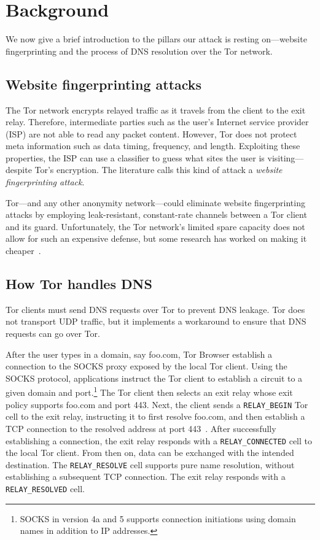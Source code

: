 \section{Background}
\label{sec:background}
We now give a brief introduction to the pillars our attack is resting
on---website fingerprinting and the process of DNS resolution over the Tor
network.

\subsection{Website fingerprinting attacks}
The Tor network encrypts relayed traffic as it travels from the client to the
exit relay.  Therefore, intermediate parties such as the user's Internet service
provider (ISP) are not able to read any packet content.  However, Tor does not
protect meta information such as data timing, frequency, and length.  Exploiting
these properties, the ISP can use a classifier to guess what sites the user is
visiting---despite Tor's encryption.  The literature calls this kind of attack a
\emph{website fingerprinting attack}.

Tor---and any other anonymity network---could eliminate website fingerprinting
attacks by employing leak-resistant, constant-rate channels between a Tor client
and its guard.  Unfortunately, the Tor network's limited spare capacity does not
allow for such an expensive defense, but some research has worked on making it
cheaper~\cite{Cai2014a}.

\subsection{How Tor handles DNS}
Tor clients must send DNS requests over Tor to prevent DNS leakage.  Tor
does not transport UDP traffic, but it implements a workaround to ensure that
DNS requests can go over Tor.

After the user types in a domain, say foo.com, Tor Browser establish a
connection to the SOCKS proxy exposed by the local Tor client.  Using the SOCKS
protocol, applications instruct the Tor client to establish a circuit to a given
domain and port.\footnote{SOCKS in version 4a and 5 supports connection
initiations using domain names in addition to IP addresses.} The Tor client then
selects an exit relay whose exit policy supports foo.com and port 443.  Next,
the client sends a \texttt{RELAY\_BEGIN} Tor cell to the exit relay, instructing
it to first resolve foo.com, and then establish a TCP connection to the resolved
address at port 443~\cite[\S~6.2]{tor-spec}.  After successfully establishing a
connection, the exit relay responds with a \texttt{RELAY\_CONNECTED} cell to the
local Tor client.  From then on, data can be exchanged with the intended
destination.  The \texttt{RELAY\_RESOLVE} cell supports pure name resolution,
without establishing a subsequent TCP connection.  The exit relay responds with
a \texttt{RELAY\_RESOLVED} cell.

